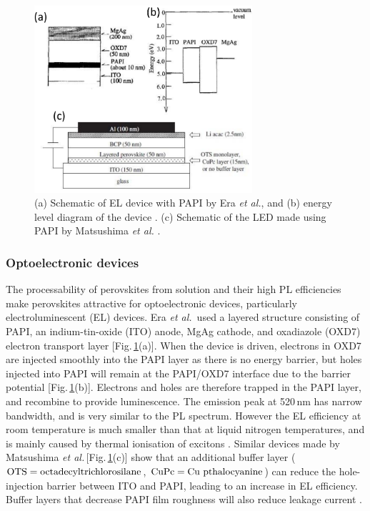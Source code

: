\begin{figure}[h!]
\centering
\includegraphics[width=0.72\textwidth]{Fig22}
\caption{(a) Schematic of EL device with PAPI by Era \textit{et al.}, and (b) energy level diagram of the device \cite{Era1994}. (c) Schematic of the LED made using PAPI by Matsushima \textit{et al.} \cite{Matsushima2005}.}
\label{2Fig22}
\end{figure}
\subsubsection{Optoelectronic devices}
The processability of perovskites from solution and their high PL efficiencies make perovskites attractive for optoelectronic devices, particularly electroluminescent (EL) devices. Era \textit{et al.}\ used a layered structure consisting of PAPI, an indium-tin-oxide (ITO) anode, MgAg cathode, and oxadiazole (OXD7) electron transport layer [Fig.\,\ref{2Fig22}(a)]. When the device is driven, electrons in OXD7 are injected smoothly into the PAPI layer as there is no energy barrier, but holes injected into PAPI will remain at the PAPI/OXD7 interface due to the barrier potential [Fig.\,\ref{2Fig22}(b)]. Electrons and holes are therefore trapped in the PAPI layer, and recombine to provide luminescence. The emission peak at 520\,nm has narrow bandwidth, and is very similar to the PL spectrum. However the EL efficiency at room temperature is much smaller than that at liquid nitrogen temperatures, and is mainly caused by thermal ionisation of excitons \cite{Era1994}. Similar devices made by Matsushima \textit{et al.\,}[Fig.\,\ref{2Fig22}(c)] show that an additional buffer layer ($\textnormal{OTS}=\textnormal{octadecyltrichlorosilane}$, $\textnormal{CuPc}=\textnormal{Cu pthalocyanine}$) can reduce the hole-injection barrier between ITO and PAPI, leading to an increase in EL efficiency. Buffer layers that decrease PAPI film roughness will also reduce leakage current \cite{Matsushima2005}.

